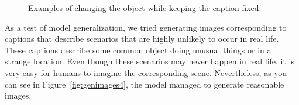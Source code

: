 \documentclass{article} %
\begin{document}
\begin{figure}[!h]
\captionsetup[subfigure]{labelformat=empty}
\begin{center}
\quad
%
\quad
%
\quad
%
\quad
%
\end{center}
\caption{Examples of changing the object while keeping the caption fixed.}
\label{fig:genimages3}
\vspace{-0.3cm}
\end{figure}

As a test of model generalization, we tried generating images corresponding to captions that describe scenarios that are highly unlikely to occur in real life. These captions describe some common object doing unusual things 
or in a strange location.
Even though these scenarios may never happen in real life, it is very easy for humans to imagine the corresponding scene. Nevertheless, as you can see in Figure~\ref{fig:genimages4}, the model managed to generate reasonable images.  
\end{document}

